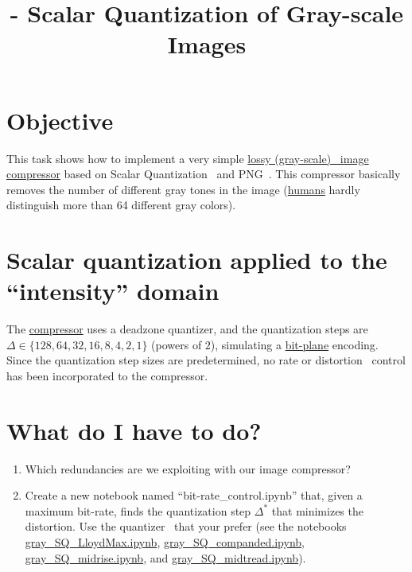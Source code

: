 

\title{\SM{} - Scalar Quantization of Gray-scale Images}

\maketitle
\tableofcontents

\section{Objective}
This task shows how to implement a very simple
\href{https://en.wikipedia.org/wiki/Lossy_compression}{lossy
  (gray-scale)~\cite{vruiz__image_IO} image compressor} based on
Scalar
Quantization~\cite{vruiz__scalar_quantization,sayood2017introduction,vetterli2014foundations}
and PNG~\cite{vruiz__PNG}. This compressor basically removes the
number of different gray tones in the image
(\href{https://en.wikipedia.org/wiki/Visual_system}{humans} hardly
distinguish more than 64 different gray colors).

\section{Scalar quantization applied to the ``intensity'' domain}
The \href{}{compressor} uses a deadzone quantizer, and the quantization steps
are $\Delta\in\{128, 64, 32, 16, 8, 4, 2, 1\}$ (powers of $2$),
simulating a \href{https://en.wikipedia.org/wiki/Bit_plane}{bit-plane}
encoding. Since the quantization step sizes are predetermined, no rate
or distortion~\cite{vruiz__information_theory} control has been
incorporated to the compressor.

\section{What do I have to do?}
\begin{enumerate}
\item Which redundancies are we exploiting with our image compressor? 
\item Create a new notebook named ``bit-rate\_control.ipynb'' that,
  given a maximum bit-rate, finds the quantization step $\Delta^*$
  that minimizes the distortion. Use the
  quantizer~\cite{vruiz__scalar_quantization} that your prefer (see
  the notebooks
  \href{https://github.com/Sistemas-Multimedia/Sistemas-Multimedia.github.io/blob/master/contents/gray_SQ/gray_SQ_LloydMax.ipynb}{gray\_SQ\_LloydMax.ipynb},
  \href{https://github.com/Sistemas-Multimedia/Sistemas-Multimedia.github.io/blob/master/contents/gray_SQ/gray_SQ_companded.ipynb}{gray\_SQ\_companded.ipynb},
  \href{https://github.com/Sistemas-Multimedia/Sistemas-Multimedia.github.io/blob/master/contents/gray_SQ/gray_SQ_midrise.ipynb}{gray\_SQ\_midrise.ipynb},
  and
  \href{https://github.com/Sistemas-Multimedia/Sistemas-Multimedia.github.io/blob/master/contents/gray_SQ/gray_SQ_midtread.ipynb}{gray\_SQ\_midtread.ipynb}).
\end{enumerate}

